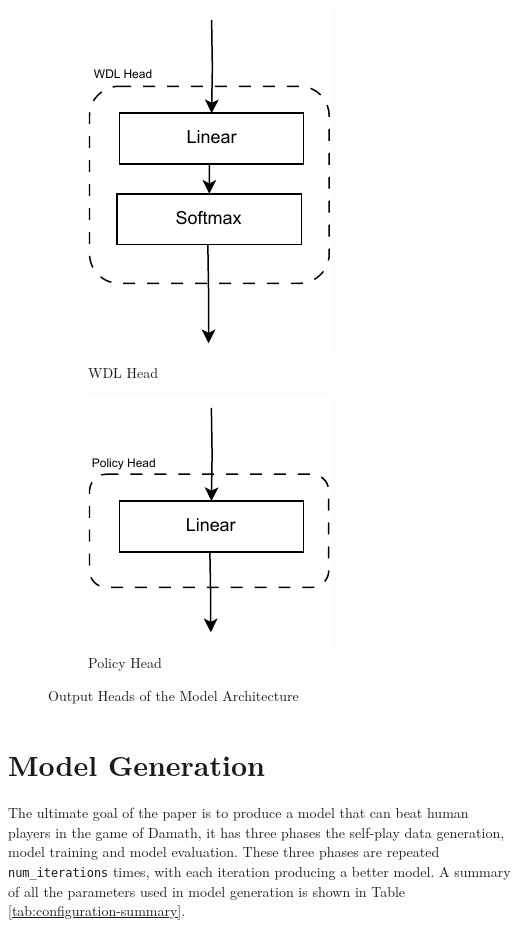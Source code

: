 \begin{figure}[H]
    \centering
    \begin{subfigure}{0.4\linewidth}
        \centering
        \includegraphics[width=0.3\linewidth]{images/WDLHead.pdf}
        \caption{WDL Head}
        \label{fig:wdl-head}
    \end{subfigure}
    \quad
    \begin{subfigure}{0.4\linewidth}
        \centering
        \includegraphics[width=0.5\linewidth]{images/PolicyHead.pdf}
        \caption{Policy Head}
        \label{fig:policy-head}
    \end{subfigure}
    \caption{Output Heads of the Model Architecture}
    \label{fig:model-output}
\end{figure}

\section{Model Generation}

The ultimate goal of the paper is to produce a model that can beat human players in the game of Damath, it has three phases the self-play data generation, model training and model evaluation. These three phases are repeated \verb|num_iterations| times, with each iteration producing a better model. A summary of all the parameters used in model generation is shown in Table \ref{tab:configuration-summary}.

